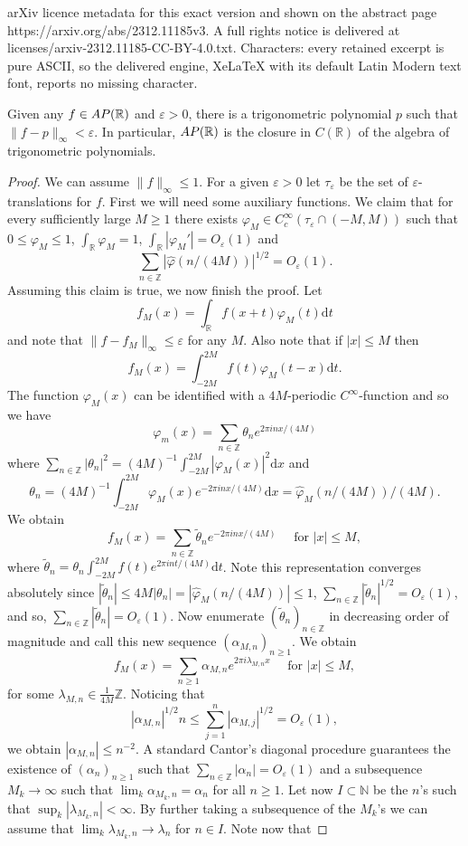 \documentclass[10pt,a4paper]{amsart}
\newcommand{\al}{\alpha}
\newcommand{\apr}{{\rm AP}(\r)}
\newcommand{\ep}{\varepsilon}
\newcommand{\ft}{\widehat}
\newcommand{\la}{\lambda}
\newcommand{\n}{\mathbb{N}}
\newcommand{\p}{\varphi}
\newcommand{\wt}{\widetilde}
\newcommand{\z}{\mathbb{Z}}
\renewcommand{\d}{\mathrm{d}}
\renewcommand{\r}{\mathbb{R}}
\begin{document}
arXiv licence metadata for this exact version and shown on the abstract page https://arxiv.org/abs/2312.11185v3. A full rights notice is delivered at licenses/arxiv-2312.11185-CC-BY-4.0.txt. Characters: every retained excerpt is pure ASCII, so the delivered engine, XeLaTeX with its default Latin Modern text font, reports no missing character.
\begin{lemma}\label{lem:polyaprox}
Given any $f\in \apr$ and $\ep>0$, there is a trigonometric polynomial $p$ such that $\|f-p\|_\infty<\ep$. In particular, $\apr$ is the closure in $C(\r)$ of the algebra of trigonometric polynomials. 
\end{lemma}

\begin{proof}
We can assume $\|f\|_\infty\leq 1$. For a given $\ep>0$ let $\tau_\ep$ be the set of $\ep$-translations for $f$.  First we will need some auxiliary functions. We claim that for every sufficiently large $M\geq 1$ there exists $\p_M\in C^\infty_c(\tau_\ep \cap (-M,M))$ such that $0\leq \p_M\leq 1$, $\int_\r \p_M =1$, $\int_\r |\p_M'| =O_{\ep}(1)$ and 
$$
\sum_{n\in \z} |\ft \p(n/(4M))|^{1/2} = O_{\ep}(1).
$$
Assuming this claim is true, we now finish the proof. Let
$$
f_M(x) = \int_\r f(x+t)\p_M(t)\d t
$$
and note that $\|f-f_M\|_\infty\leq \ep$ for any $M$. Also note that if $|x|\leq M$ then
$$
f_M(x)=  \int_{-2M}^{2M} f(t)\p_M(t-x)\d t. 
$$
The function $\p_M(x)$ can be identified with a $4M$-periodic  $C^\infty$-function and so we have
$$
\p_m(x)=\sum_{n\in\z} \theta_n e^{2\pi i n x/(4M)}
$$
where $\sum_{n\in \z} |\theta_n|^2 = (4M)^{-1}\int_{-2M}^{2M} |\p_M(x)|^2\d x$ and 
$$
\theta_n = (4M)^{-1}\int_{-2M}^{2M} \p_M(x)e^{-2\pi i n x/(4M)}\d x = \ft \p_M(n/(4M))/(4M).
$$
We obtain
$$
f_M(x) = \sum_{n\in\z} \wt \theta_n e^{-2\pi i n x/(4M)}  \quad \text{ for } |x|\leq M,
$$
where $\wt \theta_n = \theta_n \int_{-2M}^{2M}f(t) e^{2\pi i n t/(4M)}\d t$. Note this representation converges absolutely since $ |\wt \theta_n| \leq  4M|\theta_n| = |\ft \p_M(n/(4M))| \leq 1$, $\sum_{n\in\z} |\wt \theta_n|^{1/2} = O_{\ep}(1)$, and so, $\sum_{n\in\z} |\wt \theta_n|=O_{\ep}(1)$. Now enumerate $(\wt \theta_n)_{n\in \z}$ in decreasing order of magnitude and call this new sequence $(\al_{M,n})_{n\geq 1}$.  We obtain
$$
f_M(x) = \sum_{n\geq 1} \al_{M,n} e^{2\pi i \la_{M,n} x}  \quad \text{ for } |x|\leq M,
$$
for some $\la_{M,n}\in \frac{1}{4M}\z$. Noticing that 
$$
|\al_{M,n}|^{1/2}n \leq \sum_{j=1}^n |\al_{M,j}|^{1/2} = O_{\ep}(1),
$$
we obtain $|\al_{M,n}|\leq n^{-2}$. A standard Cantor's diagonal procedure guarantees the existence of $(\al_n)_{n\geq 1}$ such that $\sum_{n\in\z} |\al_n| = O_{\ep}(1)$ and a subsequence $M_k\to\infty$ such that $\lim_k \al_{M_k,n}=\al_n$ for all $n\geq 1$.  Let now $I\subset \n$ be the $n$'s such that $\sup_{k} |\la_{M_k,n}| < \infty$.  By further taking a subsequence of the $M_k$'s we can assume that $\lim_k \la_{M_k,n} \to \la_n$ for $n\in I$.  Note now that

\end{proof}
\end{document}
